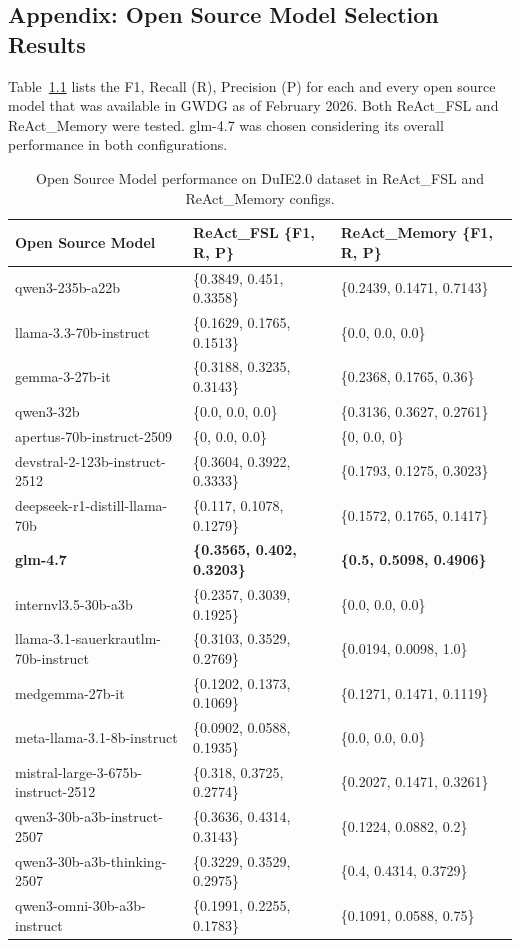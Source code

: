 \begin{appendices}
\chapter{Appendix: Open Source Model Selection Results}
\label{app:open_source_model_selection}

Table~\ref{tab:model_selection} lists the F1, Recall (R), Precision (P) for each and every open source model that was available in GWDG as of February 2026. Both ReAct\_FSL and ReAct\_Memory were tested. glm-4.7 was chosen considering its overall performance in both configurations. 

\begin{table}[h]
\centering
\caption{Open Source Model performance on DuIE2.0 dataset in ReAct\_FSL and ReAct\_Memory configs.}
\label{tab:model_selection}
\toprule 
\begin{tabularx}{\textwidth}{X|l|l}\textbf{Open Source Model} & \textbf{ReAct\_FSL \{F1, R, P\}}& \textbf{ReAct\_Memory \{F1, R, P\}}\\
\midrule
qwen3-235b-a22b & \{0.3849, 0.451, 0.3358\} & \{0.2439, 0.1471, 0.7143\} \\
llama-3.3-70b-instruct & \{0.1629, 0.1765, 0.1513\}& \{0.0, 0.0, 0.0\} \\
gemma-3-27b-it & \{0.3188, 0.3235, 0.3143\} & \{0.2368, 0.1765, 0.36\}  \\
qwen3-32b & \{0.0, 0.0, 0.0\} & \{0.3136, 0.3627, 0.2761\}\\
apertus-70b-instruct-2509 & \{0, 0.0, 0.0\} & \{0, 0.0, 0\}\\
devstral-2-123b-instruct-2512 & \{0.3604, 0.3922, 0.3333\} & \{0.1793, 0.1275, 0.3023\}\\
deepseek-r1-distill-llama-70b & \{0.117, 0.1078, 0.1279\} & \{0.1572, 0.1765, 0.1417\}\\
\textbf{glm-4.7} & \textbf{\{0.3565, 0.402, 0.3203\}} & \textbf{\{0.5, 0.5098, 0.4906\}} \\
internvl3.5-30b-a3b & \{0.2357, 0.3039, 0.1925\} & \{0.0, 0.0, 0.0\}\\
llama-3.1-sauerkrautlm-70b-instruct & \{0.3103, 0.3529, 0.2769\} & \{0.0194, 0.0098, 1.0\}\\
medgemma-27b-it & \{0.1202, 0.1373, 0.1069\} & \{0.1271, 0.1471, 0.1119\}\\
meta-llama-3.1-8b-instruct & \{0.0902, 0.0588, 0.1935\} & \{0.0, 0.0, 0.0\}\\
mistral-large-3-675b-instruct-2512 & \{0.318, 0.3725, 0.2774\} & \{0.2027, 0.1471, 0.3261\}\\
qwen3-30b-a3b-instruct-2507 & \{0.3636, 0.4314, 0.3143\} & \{0.1224, 0.0882, 0.2\}\\
qwen3-30b-a3b-thinking-2507 & \{0.3229, 0.3529, 0.2975\} & \{0.4, 0.4314, 0.3729\}\\
qwen3-omni-30b-a3b-instruct & \{0.1991, 0.2255, 0.1783\} & \{0.1091, 0.0588, 0.75\}\\
\bottomrule 
\end{tabularx}
\end{table}


\end{appendices}
